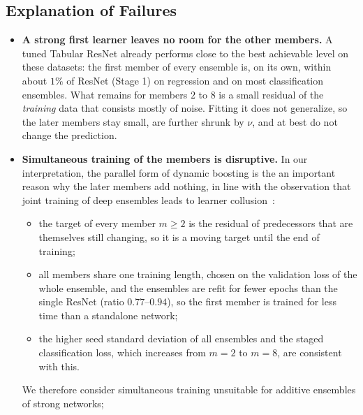 \documentclass[11pt, a4paper]{article}
\begin{document}
\subsection{Explanation of Failures}
\begin{itemize}
    \item \textbf{A strong first learner leaves no room for the other members.} A tuned Tabular ResNet already performs close to the best achievable level on these datasets: the first member of every ensemble is, on its own, within about $1\%$ of ResNet (Stage 1) on regression and on most classification ensembles. What remains for members $2$ to $8$ is a small residual of the \emph{training} data that consists mostly of noise. Fitting it does not generalize, so the later members stay small, are further shrunk by $\nu$, and at best do not change the prediction.
    \item \textbf{Simultaneous training of the members is disruptive.} In our interpretation, the parallel form of dynamic boosting is the an important reason why the later members add nothing, in line with the observation that joint training of deep ensembles leads to learner collusion~\cite{jeffares2023joint}:
    \begin{itemize}
        \item the target of every member $m \ge 2$ is the residual of predecessors that are themselves still changing, so it is a moving target until the end of training;
        \item all members share one training length, chosen on the validation loss of the whole ensemble, and the ensembles are refit for fewer epochs than the single ResNet (ratio $0.77$--$0.94$), so the first member is trained for less time than a standalone network;
        \item the higher seed standard deviation of all ensembles and the staged classification loss, which increases from $m = 2$ to $m = 8$, are consistent with this.
    \end{itemize}
    We therefore consider simultaneous training unsuitable for additive ensembles of strong networks; 
\end{itemize}
\end{document}
